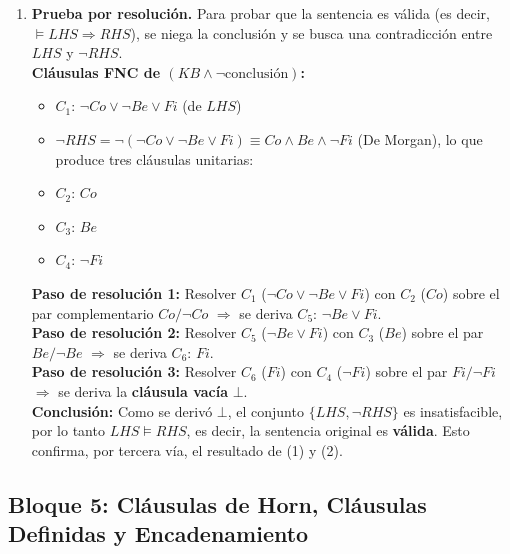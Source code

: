 \begin{enumerate}
    \textbf{Confirmación:} Ambos lados se reducen exactamente a la \emph{misma} cláusula
    $\neg Co\lor\neg Be\lor Fi$. Como la sentencia completa tiene la forma $X\Rightarrow X$ (con
    $X$ idéntico a ambos lados), es una tautología por construcción — esto confirma directamente el
    resultado de validez obtenido por enumeración en (1), y de forma más eficiente.

    \item \textbf{Prueba por resolución.} Para probar que la sentencia es válida (es decir, $\models
    LHS \Rightarrow RHS$), se niega la conclusión y se busca una contradicción entre $LHS$ y $\neg
    RHS$.\\
    \textbf{Cláusulas FNC de $(KB \land \neg\text{conclusión})$:}
    \begin{itemize}
        \item $C_1$: $\neg Co \lor \neg Be \lor Fi$ \hfill (de $LHS$)
        \item $\neg RHS = \neg(\neg Co\lor\neg Be\lor Fi) \equiv Co \land Be \land \neg Fi$
        (De Morgan), lo que produce tres cláusulas unitarias:
        \item $C_2$: $Co$
        \item $C_3$: $Be$
        \item $C_4$: $\neg Fi$
    \end{itemize}
    \textbf{Paso de resolución 1:} Resolver $C_1$ ($\neg Co\lor\neg Be\lor Fi$) con $C_2$ ($Co$) sobre
    el par complementario $Co/\neg Co$ $\Rightarrow$ se deriva $C_5$: $\neg Be \lor Fi$.\\
    \textbf{Paso de resolución 2:} Resolver $C_5$ ($\neg Be\lor Fi$) con $C_3$ ($Be$) sobre el par
    $Be/\neg Be$ $\Rightarrow$ se deriva $C_6$: $Fi$.\\
    \textbf{Paso de resolución 3:} Resolver $C_6$ ($Fi$) con $C_4$ ($\neg Fi$) sobre el par
    $Fi/\neg Fi$ $\Rightarrow$ se deriva la \textbf{cláusula vacía} $\bot$.\\
    \textbf{Conclusión:} Como se derivó $\bot$, el conjunto $\{LHS, \neg RHS\}$ es insatisfacible, por
    lo tanto $LHS \models RHS$, es decir, la sentencia original es \textbf{válida}. Esto confirma,
    por tercera vía, el resultado de (1) y (2).
\end{enumerate}

\subsection{Bloque 5: Cláusulas de Horn, Cláusulas Definidas y Encadenamiento}

